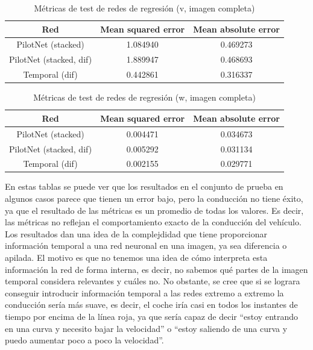 \begin{table}[H]
\centering
\caption{Métricas de test de redes de regresión (v, imagen completa)}
\label{metricas_regresion_temporal_completa_v}
\begin{tabular}{c|c|c|}
\cline{1-3}
                        \multicolumn{1}{|c|}{Red}    & Mean squared error       & Mean absolute error             \\ \hline
\multicolumn{1}{|c|}{PilotNet (stacked)}   & 1.084940    & 0.469273  \\ \hline
\multicolumn{1}{|c|}{PilotNet (stacked, dif)}     & 1.889947    & 0.468693        \\ \hline
\multicolumn{1}{|c|}{Temporal (dif)}      & 0.442861     & 0.316337   \\ \hline
\end{tabular}
\end{table}


\begin{table}[H]
\centering
\caption{Métricas de test de redes de regresión (w, imagen completa)}
\label{metricas_regresion_temporal_completa_w}
\begin{tabular}{c|c|c|}
\cline{1-3}
                        \multicolumn{1}{|c|}{Red}    & Mean squared error       & Mean absolute error             \\ \hline
\multicolumn{1}{|c|}{PilotNet (stacked)}   & 0.004471    & 0.034673   \\ \hline
\multicolumn{1}{|c|}{PilotNet (stacked, dif)}     & 0.005292    & 0.031134        \\ \hline
\multicolumn{1}{|c|}{Temporal (dif)}      & 0.002155     & 0.029771   \\ \hline
\end{tabular}
\end{table}


En estas tablas se puede ver que los resultados en el conjunto de prueba en algunos casos parece que tienen un error bajo, pero la conducción no tiene éxito, ya que el resultado de las métricas es un promedio de todas los valores. Es decir, las métricas no reflejan el comportamiento exacto de la conducción del vehículo.\\


Los resultados dan una idea de la complejdidad que tiene proporcionar información temporal a una red neuronal en una imagen, ya sea diferencia o apilada. El motivo es que no tenemos una idea de cómo interpreta esta información la red de forma interna, es decir, no sabemos qué partes de la imagen temporal considera relevantes y cuáles no. No obstante, se cree que si se lograra conseguir introducir información temporal a las redes extremo a extremo la conducción sería más suave, es decir, el coche iría casi en todos los instantes de tiempo por encima de la línea roja, ya que sería capaz de decir ``estoy entrando en una curva y necesito bajar la velocidad'' o ``estoy saliendo de una curva y puedo aumentar poco a poco la velocidad''.\\


